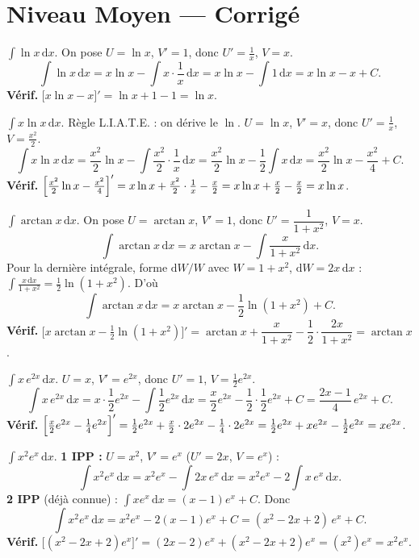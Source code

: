 \documentclass[11pt,a4paper]{article}
\newcommand{\dd}{\mathrm{d}}
\begin{document}
\section*{Niveau Moyen — Corrigé}

\begin{corr}[1]
$\displaystyle\int \ln x\,\dd x$. On pose $U=\ln x$, $V'=1$, donc $U'=\tfrac1x$, $V=x$.
\[
\int \ln x\,\dd x=x\ln x-\int x\cdot\frac1x\,\dd x=x\ln x-\int 1\,\dd x=\boxed{x\ln x-x+C.}
\]
\textbf{Vérif.} $\bigl[x\ln x-x\bigr]'=\ln x+1-1=\ln x$. \checkmark
\end{corr}

\begin{corr}[2]
$\displaystyle\int x\ln x\,\dd x$. Règle L.I.A.T.E. : on dérive le $\ln$. $U=\ln x$, $V'=x$, donc $U'=\tfrac1x$, $V=\tfrac{x^2}{2}$.
\[
\int x\ln x\,\dd x=\frac{x^2}{2}\ln x-\int \frac{x^2}{2}\cdot\frac1x\,\dd x=\frac{x^2}{2}\ln x-\frac12\int x\,\dd x
=\boxed{\frac{x^2}{2}\ln x-\frac{x^2}{4}+C.}
\]
\textbf{Vérif.} $\Bigl[\tfrac{x^2}{2}\ln x-\tfrac{x^2}{4}\Bigr]'=x\ln x+\tfrac{x^2}{2}\cdot\tfrac1x-\tfrac{x}{2}=x\ln x+\tfrac x2-\tfrac x2=x\ln x$. \checkmark
\end{corr}

\begin{corr}[3]
$\displaystyle\int \arctan x\,\dd x$. On pose $U=\arctan x$, $V'=1$, donc $U'=\dfrac{1}{1+x^2}$, $V=x$.
\[
\int \arctan x\,\dd x=x\arctan x-\int \frac{x}{1+x^2}\,\dd x.
\]
Pour la dernière intégrale, forme $\dd W/W$ avec $W=1+x^2$, $\dd W=2x\,\dd x$ :
$\displaystyle\int\frac{x\,\dd x}{1+x^2}=\frac12\ln(1+x^2)$. D'où
\[
\boxed{\int \arctan x\,\dd x=x\arctan x-\frac12\ln(1+x^2)+C.}
\]
\textbf{Vérif.} $\bigl[x\arctan x-\tfrac12\ln(1+x^2)\bigr]'=\arctan x+\dfrac{x}{1+x^2}-\dfrac12\cdot\dfrac{2x}{1+x^2}=\arctan x$. \checkmark
\end{corr}

\begin{corr}[4]
$\displaystyle\int x\,e^{2x}\,\dd x$. $U=x$, $V'=e^{2x}$, donc $U'=1$, $V=\tfrac12 e^{2x}$.
\[
\int x\,e^{2x}\,\dd x=x\cdot\frac12 e^{2x}-\int \frac12 e^{2x}\,\dd x=\frac{x}{2}e^{2x}-\frac12\cdot\frac12 e^{2x}+C
=\boxed{\frac{2x-1}{4}\,e^{2x}+C.}
\]
\textbf{Vérif.} $\Bigl[\tfrac{x}{2}e^{2x}-\tfrac14 e^{2x}\Bigr]'=\tfrac12 e^{2x}+\tfrac x2\cdot 2e^{2x}-\tfrac14\cdot 2e^{2x}=\tfrac12 e^{2x}+x e^{2x}-\tfrac12 e^{2x}=x e^{2x}$. \checkmark
\end{corr}

\begin{corr}[5]
$\displaystyle\int x^{2}e^{x}\,\dd x$. \textbf{1\iere{} IPP :} $U=x^2$, $V'=e^x$ ($U'=2x$, $V=e^x$) :
\[
\int x^2 e^x\,\dd x=x^2 e^x-\int 2x\,e^x\,\dd x=x^2 e^x-2\int x\,e^x\,\dd x.
\]
\textbf{2\ieme{} IPP} (déjà connue) : $\int x e^x\,\dd x=(x-1)e^x+C$. Donc
\[
\int x^2 e^x\,\dd x=x^2 e^x-2(x-1)e^x+C=\boxed{(x^2-2x+2)\,e^x+C.}
\]
\textbf{Vérif.} $\bigl[(x^2-2x+2)e^x\bigr]'=(2x-2)e^x+(x^2-2x+2)e^x=(x^2)e^x=x^2 e^x$. \checkmark
\end{corr}
\end{document}
